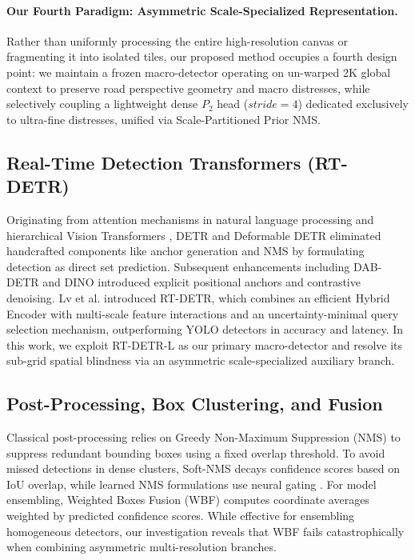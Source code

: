 \documentclass[runningheads]{llncs}
\begin{document}
\paragraph{Our Fourth Paradigm: Asymmetric Scale-Specialized Representation.} Rather than uniformly processing the entire high-resolution canvas or fragmenting it into isolated tiles, our proposed method occupies a fourth design point: we maintain a frozen macro-detector operating on un-warped 2K global context to preserve road perspective geometry and macro distresses, while selectively coupling a lightweight dense $P_2$ head ($stride=4$) dedicated exclusively to ultra-fine distresses, unified via Scale-Partitioned Prior NMS.

\subsection{Real-Time Detection Transformers (RT-DETR)}
Originating from attention mechanisms in natural language processing \cite{vaswani2017attention} and hierarchical Vision Transformers \cite{liu2021swin}, DETR \cite{carion2020end} and Deformable DETR \cite{zhu2020deformable} eliminated handcrafted components like anchor generation and NMS by formulating detection as direct set prediction. Subsequent enhancements including DAB-DETR \cite{liu2022dab} and DINO \cite{zhang2022dino} introduced explicit positional anchors and contrastive denoising. Lv et al. \cite{lv2023detrs} introduced RT-DETR, which combines an efficient Hybrid Encoder with multi-scale feature interactions and an uncertainty-minimal query selection mechanism, outperforming YOLO detectors in accuracy and latency. In this work, we exploit RT-DETR-L as our primary macro-detector and resolve its sub-grid spatial blindness via an asymmetric scale-specialized auxiliary branch.

\subsection{Post-Processing, Box Clustering, and Fusion}
Classical post-processing relies on Greedy Non-Maximum Suppression (NMS) \cite{neubeck2006efficient} to suppress redundant bounding boxes using a fixed overlap threshold. To avoid missed detections in dense clusters, Soft-NMS \cite{bodla2017soft} decays confidence scores based on IoU overlap, while learned NMS formulations use neural gating \cite{hosang2017learning}. For model ensembling, Weighted Boxes Fusion (WBF) \cite{solovyev2021weighted} computes coordinate averages weighted by predicted confidence scores. While effective for ensembling homogeneous detectors, our investigation reveals that WBF fails catastrophically when combining asymmetric multi-resolution branches.
\end{document}
